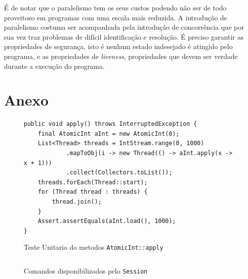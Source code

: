 \documentclass[a4paper]{article}
\begin{document}
É de notar que o paralelismo tem os seus custos podendo não ser de todo proveitoso em programas com uma escala mais reduzida. A introdução de paralelismo costuma ser acompanhada pela introdução de concorrência que por sua vez traz problemas de difícil identificação e resolução. É preciso garantir as propriedades de segurança, isto é nenhum estado indesejado é atingido pelo programa, e as propriedades de \textit{liveness}, propriedades que devem ser verdade durante a execução do programa.


\pagebreak
\section{Anexo}
\begin{figure}[H]
    \begin{verbatim}
public void apply() throws InterruptedException {
    final AtomicInt aInt = new AtomicInt(0);
    List<Thread> threads = IntStream.range(0, 1000)
            .mapToObj(i -> new Thread(() -> aInt.apply(x -> x + 1)))
            .collect(Collectors.toList());
    threads.forEach(Thread::start);
    for (Thread thread : threads) {
        thread.join();
    }
    Assert.assertEquals(aInt.load(), 1000);
}
    \end{verbatim}
    \caption{Teste Unitario do metodos \texttt{AtomicInt::apply}}
\end{figure}
\begin{figure}
    \begin{tabular}{lr}
    
    \end{tabular}
    \caption{Comandos disponibilizados pelo \texttt{Session}}
\end{figure}
\end{document}
